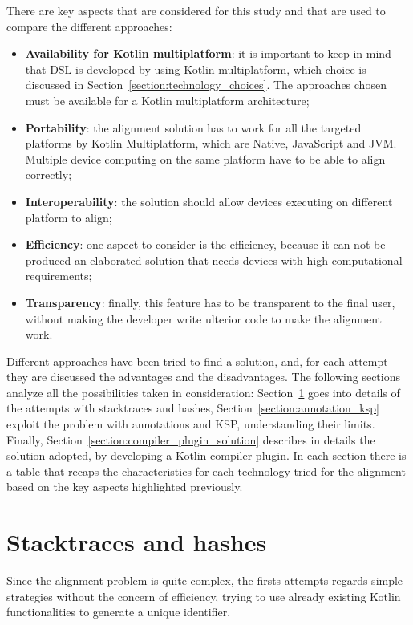 There are key aspects that are considered for this study and that are used to compare the different approaches:
\begin{itemize}
    \item \textbf{Availability for Kotlin multiplatform}: it is important to keep in mind that DSL is developed by using Kotlin multiplatform, which choice is discussed in Section~\ref{section:technology_choices}. The approaches chosen must be available for a Kotlin multiplatform architecture;
    \item \textbf{Portability}: the alignment solution has to work for all the targeted platforms by Kotlin Multiplatform, which are Native, JavaScript and JVM. Multiple device computing on the same platform have to be able to align correctly;
    \item \textbf{Interoperability}: the solution should allow devices executing on different platform to align;
    \item \textbf{Efficiency}: one aspect to consider is the efficiency, because it can not be produced an elaborated solution that needs devices with high computational requirements;
    \item \textbf{Transparency}: finally, this feature has to be transparent to the final user, without making the developer write ulterior code to make the alignment work.
\end{itemize}

Different approaches have been tried to find a solution, and, for each attempt they are discussed the advantages and the disadvantages. The following sections analyze all the possibilities taken in consideration: Section~\ref{section:stacktraces_hashes} goes into details of the attempts with stacktraces and hashes, Section~\ref{section:annotation_ksp} exploit the problem with annotations and KSP, understanding their limits. Finally, Section~\ref{section:compiler_plugin_solution} describes in details the solution adopted, by developing a Kotlin compiler plugin. In each section there is a table that recaps the characteristics for each technology tried for the alignment based on the key aspects highlighted previously.

\section{Stacktraces and hashes}\label{section:stacktraces_hashes}
Since the alignment problem is quite complex, the firsts attempts regards simple strategies without the concern of efficiency, trying to use already existing Kotlin functionalities to generate a unique identifier.

